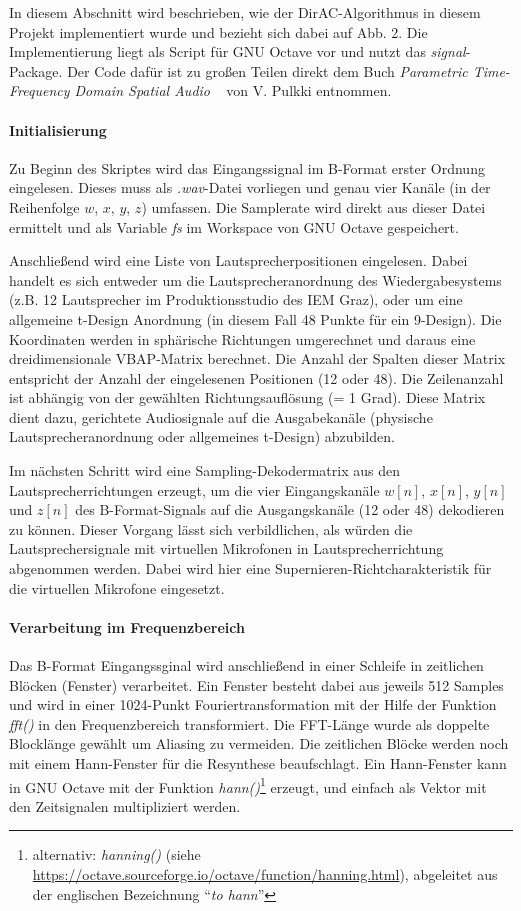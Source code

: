 In diesem Abschnitt wird beschrieben, wie der DirAC-Algorithmus in diesem Projekt implementiert wurde und bezieht sich dabei auf Abb. 2. Die Implementierung liegt als Script für GNU Octave vor und nutzt das \textit{signal}-Package. Der Code dafür ist zu großen Teilen direkt dem Buch \textit{Parametric Time-Frequency Domain Spatial Audio} ~\cite{spatial-book} von V. Pulkki entnommen.

\paragraph{Initialisierung}
Zu Beginn des Skriptes wird das Eingangssignal im B-Format erster Ordnung eingelesen. Dieses muss als \textit{.wav}-Datei vorliegen und genau vier Kanäle (in der Reihenfolge $w$, $x$, $y$, $z$) umfassen. Die Samplerate wird direkt aus dieser Datei ermittelt und als Variable \textit{fs} im Workspace von GNU Octave gespeichert.

Anschließend wird eine Liste von Lautsprecherpositionen eingelesen. Dabei handelt es sich entweder um die Lautsprecheranordnung des Wiedergabesystems (z.B. 12 Lautsprecher im Produktionsstudio des IEM Graz), oder um eine allgemeine t-Design Anordnung (in diesem Fall 48 Punkte für ein 9-Design). Die Koordinaten werden in sphärische Richtungen umgerechnet und daraus eine dreidimensionale VBAP-Matrix berechnet. Die Anzahl der Spalten dieser Matrix entspricht der Anzahl der eingelesenen Positionen (12 oder 48). Die Zeilenanzahl ist abhängig von der gewählten Richtungsauflösung (= 1 Grad). Diese Matrix dient dazu, gerichtete Audiosignale auf die Ausgabekanäle (physische Lautsprecheranordnung oder allgemeines t-Design) abzubilden.

Im nächsten Schritt wird eine Sampling-Dekodermatrix \cite{ambi-book} aus den Lautsprecherrichtungen erzeugt, um die vier Eingangskanäle $w[n]$, $x[n]$, $y[n]$ und $z[n]$ des B-Format-Signals auf die Ausgangskanäle (12 oder 48) dekodieren zu können.
Dieser Vorgang lässt sich verbildlichen, als würden die Lautsprechersignale mit virtuellen Mikrofonen in Lautsprecherrichtung abgenommen werden.
Dabei wird hier eine Supernieren-Richtcharakteristik für die virtuellen Mikrofone eingesetzt.

\paragraph{Verarbeitung im Frequenzbereich}
Das B-Format Eingangssginal wird anschließend in einer Schleife in zeitlichen Blöcken (Fenster) verarbeitet. Ein Fenster besteht dabei aus jeweils 512 Samples und wird in einer 1024-Punkt Fouriertransformation mit der Hilfe der Funktion \textit{fft()} in den Frequenzbereich transformiert. Die FFT-Länge wurde als doppelte Blocklänge gewählt um Aliasing zu vermeiden. Die zeitlichen Blöcke werden noch mit einem Hann-Fenster für die Resynthese beaufschlagt. Ein Hann-Fenster kann in GNU Octave mit der Funktion \textit{hann()}\footnote{alternativ: \textit{hanning()} (siehe \url{https://octave.sourceforge.io/octave/function/hanning.html}), abgeleitet aus der englischen Bezeichnung ``\textit{to hann}''} erzeugt, und einfach als Vektor mit den Zeitsignalen multipliziert werden.
